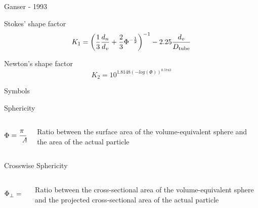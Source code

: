 \documentclass[11pt]{beamer}
\begin{document}
	\begin{frame}{Ganser - 1993}
		\begin{block}{Stokes' shape factor}
			\begin{equation*}
			K_1 = \left( \frac{1}{3} \frac{d_n}{d_v} + \frac{2}{3} \Phi^{-\frac{1}{2}} \right)^{-1} -2.25 \frac{d_v}{D_{\textup{tube}}} 
			\end{equation*}
		\end{block}
		\begin{block}{Newton's shape factor}
			\begin{equation*}
			K_2 = 10^{1.8148 (-log(\Phi))^{0.5743}}
			\end{equation*}
		\end{block}
	\end{frame}

	\begin{frame}{Symbols}
		\begin{block}{Sphericity}
			\begin{columns}[T]
				\begin{column}{.4\textwidth}
					\begin{equation*}
					\Phi = \dfrac{\pi \ d_{\textup{v}}^2} {A_{\textup{p}}}
					\end{equation*}
				\end{column}
				
				\begin{column}{.6\textwidth}
					Ratio between the surface area of the volume-equivalent sphere and the area of the actual particle
				\end{column}
			\end{columns}
		\end{block}
		\vfill
		\begin{block}{Crosswise Sphericity}
			\begin{columns}[T]
				\begin{column}{.4\textwidth}
					\begin{equation*}
					\Phi_{\perp} = \dfrac{\frac{\pi}{4}\ d_{\textup{v}}^2} {A_{\textup{p}, \perp}}
					\end{equation*}
				\end{column}
				
				\begin{column}{.6\textwidth}
					Ratio between the cross-sectional area of the volume-equivalent sphere and the projected cross-sectional area of the actual particle
				\end{column}
			\end{columns}
		\end{block}
	\end{frame}
	
\end{document}
